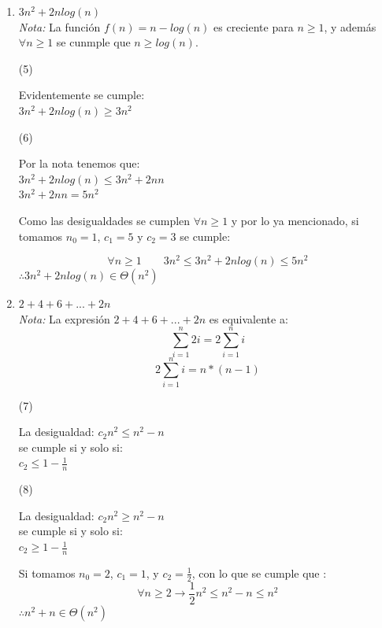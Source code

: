 \documentclass{article}
\begin{document}
\begin{enumerate}
    
    \item $3n^2 + 2  n log(n) $\\
    
    \textit{Nota: } La función $f(n) = n -log(n)$ es creciente para $n \geq 1$, y además $\forall  n \geq 1$ se cunmple que $n\geq log(n)$.
    \begin{multicols}{2}
    \begin{center}(5) \end{center}
    Evidentemente se cumple:  \\
     $3n^2 + 2  n log(n) \geq 3n^2$
    \columnbreak
     \begin{center}(6) \end{center}
    Por la nota tenemos que:\\
    $3n^2 + 2  n log(n) \leq  3n^2 + 2  n  n$\\
    $ 3n^2 + 2  n  n =  5n^2$
    \end{multicols}
    
    
    Como las desigualdades se cumplen $\forall n \geq 1$ y por lo ya mencionado, si tomamos $n_0 = 1$, $c_1 = 5$ y $c_2 = 3$ se cumple: 
    
    \[\forall n \geq 1 \qquad 3  n^2 \leq 3n^2 + 2  n log(n)  \leq 5  n^2 \]
    $\therefore 3n^2 + 2  n log(n) \in \Theta(n^2)$
    
    
    \item $2+4+6+... +2n$ \\
    \textit{Nota:} La expresión $2+4+6+...+2  n$ es equivalente a:
    \[\sum_{i=1}^n 2 i = 2 \sum_{i=1}^n i \]
    \[ 2 \sum_{i=1}^n i = n *(n-1)\]
    
    \begin{multicols}{2}
    \begin{center}(7) \end{center}
     La desigualdad: $c_2  n^2 \leq  n^2-n$ \\
         se cumple si y solo si: \\
         $c_2 \leq 1 - \frac{1}{n}$ 
    \columnbreak
     \begin{center}(8) \end{center}
    La desigualdad: $c_2  n^2 \geq  n^2-n$ \\
         se cumple si y solo si: \\
         $c_2 \geq 1 - \frac{1}{n}$
    \end{multicols}
    Si tomamos $n_0 = 2$, $c_1 =1$, y $c_2 = \frac{1}{2}$, con lo que se cumple que : 
    \[\forall n \geq 2 \rightarrow \frac{1}{2}  n^2 \leq n^2 -n  \leq n^2 \]
    $\therefore n^2 + n  \in \Theta(n^2)$
    

\end{enumerate}
\end{document}
